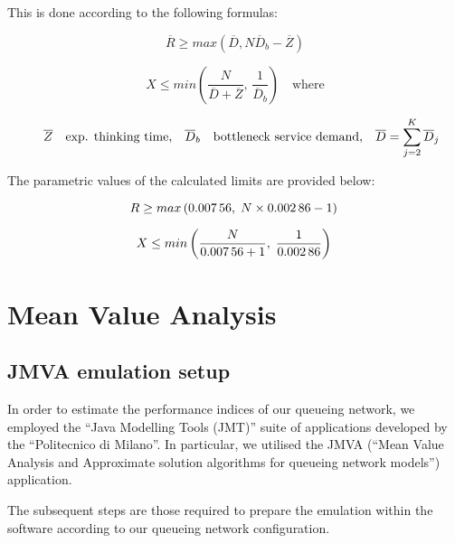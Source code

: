 This is done according to the following formulas:

\begin{equation}
	\label{eq:asymptotic-bounds-expected-response-time}
	\overline{R} \geq max\left(\overline{D},N\overline{D}_b-\overline{Z}\right)
\end{equation}

\begin{equation}
	\label{eq:asymptotic-bounds-throughput}
	X \leq min\left(\frac{N}{\overline{D}+\overline{Z}},\,\frac{1}{\overline{D}_b}\right) \quad \text{where}
\end{equation}

\[
	\quad \overline{Z} \quad \text{exp. thinking time,} \quad \overline{D}_b \quad \text{bottleneck service demand,} \quad \overline{D} = \sum^{K}_{j=2}\overline{D}_{j}  \\
\]

The parametric values of the calculated limits are provided below:

\[
 R \geq max\left(\num[round-mode=places, round-precision=5]{0.00756138888888889},\;N\times\num[round-mode=places, round-precision=5]{0.00286250000000000}-1\right) \\
\]

\[
 X \leq min\left(\frac{N}{\num[round-mode=places, round-precision=5]{0.00756138888888889}+1},\;\frac{1}{\num[round-mode=places, round-precision=5]{0.00286250000000000}}\right) \\
\]

\section{Mean Value Analysis}

\subsection{JMVA emulation setup}

In order to estimate the performance indices of our queueing network, we employed the ``Java Modelling Tools (JMT)'' suite of applications developed by the ``Politecnico di Milano''.
In particular, we utilised the JMVA (``Mean Value Analysis and Approximate solution algorithms for queueing network models'') application.

The subsequent steps are those required to prepare the emulation within the software according to our queueing network configuration.

\clearpage

